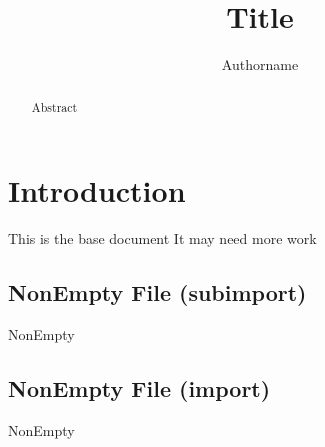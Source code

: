 \documentclass{article}
\title{Title}
\author{Authorname}
\begin{document}
\maketitle

\begin{abstract}
    Abstract
\end{abstract}

\section{Introduction}
This is the base document
It may need more work

\subsection{NonEmpty File (subimport)}
{NonEmpty}%

\subsection{NonEmpty File (import)}
{NonEmpty}%
\end{document}
